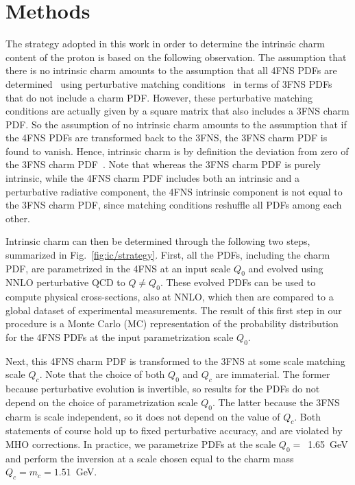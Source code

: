 \documentclass[11pt,a4paper]{article}
\begin{document}
\section*{Methods}
\label{sec:ic/methods}

The strategy adopted in this work in order to
determine the intrinsic charm content of the proton is 
based on the following
observation.
%
The assumption that there is no intrinsic charm
amounts to the assumption
that all 4FNS PDFs are determined~\cite{Collins:1986mp} using
perturbative matching conditions~\cite{pdfnnlo} in terms of 
3FNS PDFs
that do not include
a charm PDF.
%
However, these perturbative matching conditions are
actually given by a square matrix that also includes a 3FNS charm
PDF.
%
So the assumption of no intrinsic charm amounts to the assumption
that if the 4FNS PDFs are transformed back to the 3FNS, the 3FNS charm
PDF is found to vanish. Hence, intrinsic charm is by definition the
deviation from zero of the 3FNS charm PDF~\cite{Ball:2015dpa}. Note
that whereas the 3FNS charm PDF is purely intrinsic, while the 4FNS
charm PDF includes both an intrinsic and a perturbative
 radiative component, the
4FNS intrinsic component is not equal to the 3FNS charm PDF, since
matching conditions reshuffle all PDFs among each other. 

Intrinsic charm can then be determined through the following two steps,
summarized in Fig.~\ref{fig:ic/strategy}. 
First, all the PDFs, including the charm PDF, are parametrized 
in the 4FNS at an input scale $Q_0$ and evolved 
using NNLO perturbative QCD to   $Q \not = Q_0$.
%
These evolved PDFs can be used to 
compute physical cross-sections, also at NNLO, which then are
compared to a global dataset of experimental measurements.
%
The result of this first step in our procedure is 
a Monte Carlo (MC) representation
of the probability distribution for the 4FNS PDFs at the input
parametrization scale $Q_0$.

Next, this 4FNS charm PDF is transformed to the 3FNS at some scale matching scale
$Q_c$.
%
Note that the choice of both $Q_0$ and $Q_c$ are immaterial. The former
because perturbative evolution is invertible, so
results for the PDFs do not depend on the choice of
parametrization scale $Q_0$. The latter because 
the 3FNS charm is scale independent, so it does not depend on the
value of $Q_c$.
Both statements of course hold up to fixed perturbative accuracy, and
are violated by MHO corrections.
%
In practice, we parametrize PDFs at the scale
$Q_0=$~1.65~GeV and perform the inversion at a scale
chosen equal to the charm mass $Q_c=m_c=1.51$~GeV.
\end{document}
